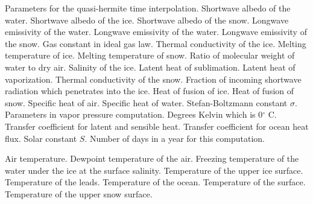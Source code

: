 \begin{klist}
\begin{klist}
  \end{klist}
   \mbox{}
  \begin{klist}
       Parameters for the quasi-hermite time
  interpolation.
         Shortwave albedo of the water.
           Shortwave albedo of the ice.
          Shortwave albedo of the snow.
          Longwave emissivity of the water.
            Longwave emissivity of the water.
           Longwave emissivity of the snow.
              Gas constant in ideal gas law.
      Thermal conductivity of the ice.
               Melting temperature of ice.
               Melting temperature of snow.
                Ratio of molecular weight of water to dry
  air.
                  Salinity of the ice.
     Latent heat of sublimation.
     Latent heat of vaporization.
     Thermal conductivity of the snow.
         Fraction of incoming shortwave radiation
  which penetrates into the ice.
        Heat of fusion of ice.
       Heat of fusion of snow.
       Specific heat of air.
       Specific heat of water.
               Stefan-Boltzmann constant $\sigma$.
     Parameters in vapor pressure
  computation.
                 Degrees Kelvin which is 0$^\circ$ C.
          Transfer coefficient for latent and
  sensible heat.
       Transfer coefficient for ocean heat flux.
          Solar constant $S$.
       Number of days in a year for this
  computation.
  \end{klist}
   \mbox{}
  \begin{klist}
          Air temperature.
          Dewpoint temperature of the air.
       Freezing temperature of the water under the
  ice at the surface salinity.
          Temperature of the upper ice surface.
         Temperature of the leads.
        Temperature of the ocean.
          Temperature of the surface.
         Temperature of the upper snow surface.

\end{klist}
\end{klist}
